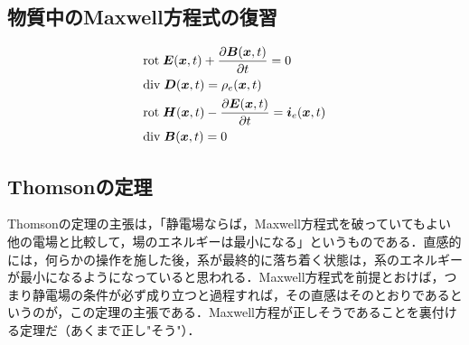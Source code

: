 \documentclass[a4paper,10pt,uplatex]{jsarticle}
\newcommand{\rot}{\mathrm{rot}\;}
\renewcommand{\div}{\mathrm{div}\;}
\newcommand{\E}{\vb*{E}}
\newcommand{\B}{\vb*{B}}
\newcommand{\D}{\vb*{D}}
\renewcommand{\H}{\vb*{H}}
\newcommand{\x}{\vb*{x}}
\renewcommand{\i}{\vb*{i}}
\begin{document}
\subsection{物質中のMaxwell方程式の復習}
\begin{align}
    &\rot \E(\x,t) + \pdv{\B(\x,t)}{t} = 0\\
    &\div \D(\x,t) = \rho_e(\x,t) \\
    &\rot \H(\x,t) - \pdv{\E(\x,t)}{t} = \i_e(\x,t) \\
    &\div \B(\x,t) = 0
\end{align}

\subsection{Thomsonの定理}
Thomsonの定理の主張は，「静電場ならば，Maxwell方程式を破っていてもよい他の電場と比較して，場のエネルギーは最小になる」というものである．直感的には，何らかの操作を施した後，系が最終的に落ち着く状態は，系のエネルギーが最小になるようになっていると思われる．Maxwell方程式を前提とおけば，つまり静電場の条件が必ず成り立つと過程すれば，その直感はそのとおりであるというのが，この定理の主張である．Maxwell方程が正しそうであることを裏付ける定理だ（あくまで正し"そう"）．
\end{document}
